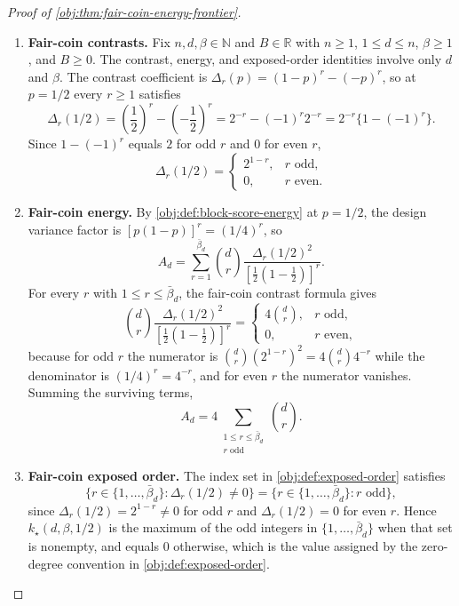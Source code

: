 \documentclass[11pt]{article}
\begin{document}
\begin{proof}[Proof of \cref{obj:thm:fair-coin-energy-frontier}]
\begin{enumerate}
\item \textbf{Fair-coin contrasts.}
Fix \(n,d,\beta\in\mathbb N\) and \(B\in\mathbb R\) with \(n\ge1\), \(1\le d\le n\), \(\beta\ge1\), and \(B\ge0\).  The contrast, energy, and exposed-order identities involve only \(d\) and \(\beta\).  The contrast coefficient is \(\Delta_r(p)=(1-p)^r-(-p)^r\), so at \(p=1/2\) every \(r\ge1\) satisfies
\[
\Delta_r(1/2)
=
\left(\frac12\right)^r-\left(-\frac12\right)^r
=
2^{-r}-(-1)^r2^{-r}
=
2^{-r}\bigl\{1-(-1)^r\bigr\}.
\]
Since \(1-(-1)^r\) equals \(2\) for odd \(r\) and \(0\) for even \(r\),
\[
\Delta_r(1/2)=
\begin{cases}
2^{1-r}, & r\text{ odd},\\
0, & r\text{ even}.
\end{cases}
\] %

\item \textbf{Fair-coin energy.}
By \cref{obj:def:block-score-energy} at \(p=1/2\), the design variance factor is \([p(1-p)]^r=(1/4)^r\), so
\[
A_d
=
\sum_{r=1}^{\bar\beta_d}
\binom{d}{r}
\frac{\Delta_r(1/2)^2}{\left[\frac12\left(1-\frac12\right)\right]^r}.
\]
For every \(r\) with \(1\le r\le\bar\beta_d\), the fair-coin contrast formula gives
\[
\binom{d}{r}
\frac{\Delta_r(1/2)^2}{\left[\frac12\left(1-\frac12\right)\right]^r}
=
\begin{cases}
4\binom{d}{r}, & r\text{ odd},\\
0, & r\text{ even},
\end{cases}
\]
because for odd \(r\) the numerator is \(\binom dr(2^{1-r})^2=4\binom dr4^{-r}\) while the denominator is \((1/4)^r=4^{-r}\), and for even \(r\) the numerator vanishes.  Summing the surviving terms,
\[
A_d
=
4\sum_{\substack{1\le r\le \bar\beta_d\\ r\text{ odd}}}
\binom{d}{r}.
\] %

\item \textbf{Fair-coin exposed order.}
The index set in \cref{obj:def:exposed-order} satisfies
\[
\bigl\{r\in\{1,\ldots,\bar\beta_d\}:\Delta_r(1/2)\ne0\bigr\}
=
\bigl\{r\in\{1,\ldots,\bar\beta_d\}:r\text{ odd}\bigr\},
\]
since \(\Delta_r(1/2)=2^{1-r}\ne0\) for odd \(r\) and \(\Delta_r(1/2)=0\) for even \(r\).  Hence \(k_\star(d,\beta,1/2)\) is the maximum of the odd integers in \(\{1,\ldots,\bar\beta_d\}\) when that set is nonempty, and equals \(0\) otherwise, which is the value assigned by the zero-degree convention in \cref{obj:def:exposed-order}. %


\end{enumerate}
\end{proof}
\end{document}
